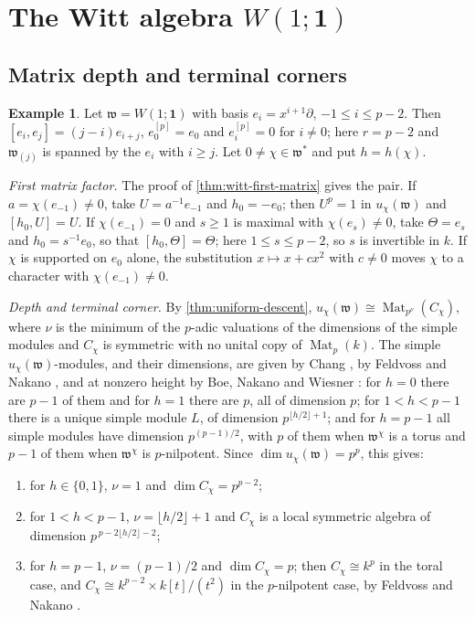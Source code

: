 \documentclass[11pt,reqno]{amsart}
\theoremstyle{definition}
\theoremstyle{remark}
\theoremstyle{definition}
\newtheorem{example}[example]{Example}
\newcommand{\Mat}{\operatorname{Mat}}
\begin{document}
\section{The Witt algebra \texorpdfstring{$W(1;\mathbf1)$}{W(1;1)}}\label{sec:w11}

\subsection{Matrix depth and terminal corners}\label{subsec:w11}

\begin{example}\label{ex:w11}
Let $\mathfrak w=W(1;\mathbf1)$ with basis $e_i=x^{i+1}\partial$,
$-1\le i\le p-2$.  Then $[e_i,e_j]=(j-i)e_{i+j}$, $e_0^{[p]}=e_0$ and
$e_i^{[p]}=0$ for $i\ne0$; here $r=p-2$ and $\mathfrak w_{(j)}$ is spanned
by the $e_i$ with $i\ge j$.  Let $0\ne\chi\in\mathfrak w^*$ and put
$h=h(\chi)$.

\emph{First matrix factor.}  The proof of \cref{thm:witt-first-matrix}
gives the pair.  If $a=\chi(e_{-1})\ne0$, take $U=a^{-1}e_{-1}$
and $h_0=-e_0$; then $U^p=1$ in $u_\chi(\mathfrak w)$ and $[h_0,U]=U$.  If
$\chi(e_{-1})=0$ and $s\ge1$ is maximal with $\chi(e_s)\ne0$, take
$\Theta=e_s$ and $h_0=s^{-1}e_0$, so that $[h_0,\Theta]=\Theta$; here
$1\le s\le p-2$, so $s$ is invertible in $k$.  If $\chi$ is supported on
$e_0$ alone, the substitution $x\mapsto x+cx^2$ with $c\ne0$ moves $\chi$
to a character with $\chi(e_{-1})\ne0$.

\emph{Depth and terminal corner.}  By \cref{thm:uniform-descent},
$u_\chi(\mathfrak w)\cong\Mat_{p^\nu}(C_\chi)$, where $\nu$ is the minimum
of the $p$-adic valuations of the dimensions of the simple modules and
$C_\chi$ is symmetric with no unital copy of $\Mat_p(k)$.  The simple
$u_\chi(\mathfrak w)$-modules, and their dimensions, are given by Chang
\cite{Chang1941}, by Feldvoss and Nakano \cite{FeldvossNakano1998}, and
at nonzero height by Boe, Nakano and Wiesner
\cite[\S4]{BoeNakanoWiesner2009}: for $h=0$ there are $p-1$ of them and for
$h=1$ there are $p$, all of dimension $p$; for $1<h<p-1$ there is a unique
simple module $L$, of dimension $p^{\lfloor h/2\rfloor+1}$; and for $h=p-1$
all simple modules have dimension $p^{(p-1)/2}$, with $p$ of them when
$\mathfrak w^\chi$ is a torus and $p-1$ of them when $\mathfrak w^\chi$ is
$p$-nilpotent.  Since $\dim u_\chi(\mathfrak w)=p^p$, this gives:
\begin{enumerate}
\item for $h\in\{0,1\}$, $\nu=1$ and $\dim C_\chi=p^{p-2}$;
\item for $1<h<p-1$, $\nu=\lfloor h/2\rfloor+1$ and $C_\chi$ is a local
symmetric algebra of dimension $p^{\,p-2\lfloor h/2\rfloor-2}$;
\item for $h=p-1$, $\nu=(p-1)/2$ and $\dim C_\chi=p$; then
$C_\chi\cong k^p$ in the toral case, and
$C_\chi\cong k^{p-2}\times k[t]/(t^2)$ in the $p$-nilpotent case, by
Feldvoss and Nakano \cite[Theorem~2.6]{FeldvossNakano1998}.
\end{enumerate}


\end{example}
\end{document}

